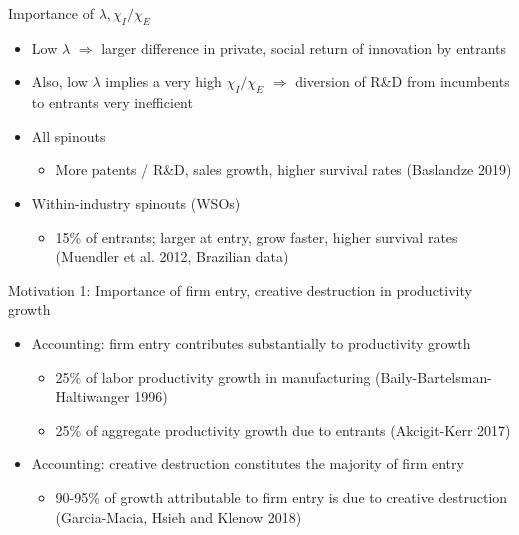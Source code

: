 \documentclass[english,usenames,dvipsnames]{beamer}
\begin{document}
\begin{frame}{Importance of $\lambda, \chi_I / \chi_E$}
\begin{itemize}
	\item Low $\lambda$ $\Rightarrow$ larger difference in private, social return of innovation by entrants
	\item Also, low $\lambda$ implies a very high $\chi_I / \chi_E$ $\Rightarrow$ diversion of R\&D from incumbents to entrants very inefficient
\end{itemize}
\end{frame}

\appendix



\begin{frame}\label{spinouts_facts_from_literature}
\hyperlink{motivation_spillovers}{}
\begin{itemize}
\item All spinouts
\begin{itemize}
\item More patents / R\&D, sales growth, higher survival rates (Baslandze 2019) 
\end{itemize}
\item Within-industry spinouts (WSOs)
\begin{itemize}
\item 15\% of entrants; larger at entry, grow faster, higher survival rates (Muendler et al. 2012, Brazilian data)
\end{itemize}
\end{itemize}
\end{frame}

\begin{frame}{Motivation 1: Importance of firm entry, creative destruction in productivity growth}
\begin{itemize}
	\item Accounting: firm entry contributes substantially to productivity growth
	\begin{itemize}
		\item 25\% of labor productivity growth in manufacturing (Baily-Bartelsman-Haltiwanger 1996)
		\item 25\% of aggregate productivity growth due to entrants (Akcigit-Kerr 2017)
	\end{itemize}
	\item Accounting: creative destruction constitutes the majority of firm entry
	\begin{itemize}
		\item 90-95\% of growth attributable to firm entry is due to creative destruction (Garcia-Macia, Hsieh and Klenow 2018)
	\end{itemize}
\end{itemize}
\end{frame}
\end{document}
